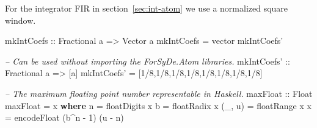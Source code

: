\documentclass[
  a4paper,
]{article}
\newenvironment{Shaded}{}{}
\newcommand{\CommentTok}[1]{\textcolor[rgb]{0.38,0.63,0.69}{\textit{#1}}}
\newcommand{\DataTypeTok}[1]{\textcolor[rgb]{0.56,0.13,0.00}{#1}}
\newcommand{\DecValTok}[1]{\textcolor[rgb]{0.25,0.63,0.44}{#1}}
\newcommand{\FunctionTok}[1]{\textcolor[rgb]{0.02,0.16,0.49}{#1}}
\newcommand{\KeywordTok}[1]{\textcolor[rgb]{0.00,0.44,0.13}{\textbf{#1}}}
\newcommand{\NormalTok}[1]{#1}
\newcommand{\OtherTok}[1]{\textcolor[rgb]{0.00,0.44,0.13}{#1}}
\begin{document}
\begin{Shaded}
\end{Shaded}

For the integrator FIR in section~\ref{sec:int-atom} we use a normalized
square window.

\begin{Shaded}
\begin{Highlighting}[numbers=left,,firstnumber=96,]
\OtherTok{mkIntCoefs ::} \DataTypeTok{Fractional}\NormalTok{ a }\OtherTok{=>} \DataTypeTok{Vector}\NormalTok{ a}
\NormalTok{mkIntCoefs }\FunctionTok{=}\NormalTok{ vector mkIntCoefs'}
\end{Highlighting}
\end{Shaded}

\begin{Shaded}
\begin{Highlighting}[numbers=left,,firstnumber=99,]
\CommentTok{-- Can be used without importing the ForSyDe.Atom libraries.}
\OtherTok{mkIntCoefs' ::} \DataTypeTok{Fractional}\NormalTok{ a }\OtherTok{=>}\NormalTok{ [a]}
\NormalTok{mkIntCoefs' }\FunctionTok{=}\NormalTok{ [}\DecValTok{1}\FunctionTok{/}\DecValTok{8}\NormalTok{,}\DecValTok{1}\FunctionTok{/}\DecValTok{8}\NormalTok{,}\DecValTok{1}\FunctionTok{/}\DecValTok{8}\NormalTok{,}\DecValTok{1}\FunctionTok{/}\DecValTok{8}\NormalTok{,}\DecValTok{1}\FunctionTok{/}\DecValTok{8}\NormalTok{,}\DecValTok{1}\FunctionTok{/}\DecValTok{8}\NormalTok{,}\DecValTok{1}\FunctionTok{/}\DecValTok{8}\NormalTok{,}\DecValTok{1}\FunctionTok{/}\DecValTok{8}\NormalTok{] }
\end{Highlighting}
\end{Shaded}

\begin{Shaded}
\begin{Highlighting}[numbers=left,,firstnumber=103,]
\CommentTok{-- The maximum floating point number representable in Haskell. }
\OtherTok{maxFloat ::} \DataTypeTok{Float}
\NormalTok{maxFloat }\FunctionTok{=}\NormalTok{ x}
 \KeywordTok{where}\NormalTok{ n }\FunctionTok{=} \FunctionTok{floatDigits}\NormalTok{ x}
\NormalTok{       b }\FunctionTok{=} \FunctionTok{floatRadix}\NormalTok{ x}
\NormalTok{       (_, u) }\FunctionTok{=} \FunctionTok{floatRange}\NormalTok{ x}
\NormalTok{       x }\FunctionTok{=} \FunctionTok{encodeFloat}\NormalTok{ (b}\FunctionTok{^}\NormalTok{n }\FunctionTok{-} \DecValTok{1}\NormalTok{) (u }\FunctionTok{-}\NormalTok{ n)}
\end{Highlighting}
\end{Shaded}
\end{document}
